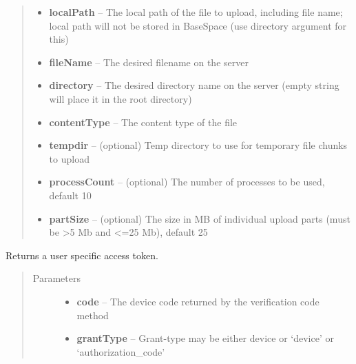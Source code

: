 \documentclass[letterpaper,10pt,english]{sphinxmanual}
\begin{document}
\begin{fulllineitems}
\begin{fulllineitems}
\begin{quote}
\begin{description}
\begin{itemize}
\item {} 
\textbf{localPath} -- The local path of the file to upload, including file name; local path will not be stored in BaseSpace (use directory argument for this)

\item {} 
\textbf{fileName} -- The desired filename on the server

\item {} 
\textbf{directory} -- The desired directory name on the server (empty string will place it in the root directory)

\item {} 
\textbf{contentType} -- The content type of the file

\item {} 
\textbf{tempdir} -- (optional) Temp directory to use for temporary file chunks to upload

\item {} 
\textbf{processCount} -- (optional) The number of processes to be used, default 10

\item {} 
\textbf{partSize} -- (optional) The size in MB of individual upload parts (must be \textgreater{}5 Mb and \textless{}=25 Mb), default 25

\end{itemize}

\end{description}\end{quote}

\end{fulllineitems}


\begin{fulllineitems}
\label{Available modules:BaseSpacePy.api.BaseSpaceAPI.BaseSpaceAPI.obtainAccessToken}
Returns a user specific access token.
\begin{quote}\begin{description}
\item[{Parameters}] \leavevmode\begin{itemize}
\item {} 
\textbf{code} -- The device code returned by the verification code method

\item {} 
\textbf{grantType} -- Grant-type may be either device or `device' or `authorization\_code'


\end{itemize}
\end{description}
\end{quote}
\end{fulllineitems}
\end{fulllineitems}
\end{document}
